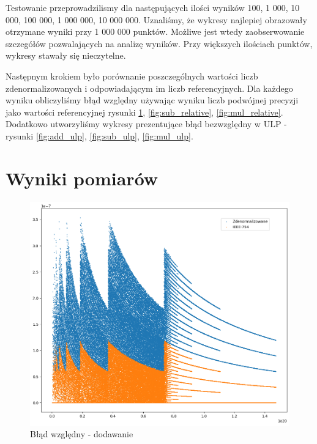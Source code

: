 \documentclass{article}
\begin{document}
Testowanie przeprowadzilismy dla następujących ilości wyników 100, 1 000, 10 000, 100 000, 1 000 000, 10 000 000.
Uznaliśmy, że wykresy najlepiej obrazowały otrzymane wyniki przy 1 000 000 punktów.
Możliwe jest wtedy zaobserwowanie szczegółów pozwalających na analizę wyników.
Przy większych ilościach punktów, wykresy stawały się nieczytelne.

Następnym krokiem było porównanie poszczególnych wartości liczb zdenormalizowanych i odpowiadającym im liczb referencyjnych.
Dla każdego wyniku obliczyliśmy błąd względny używając wyniku liczb podwójnej precyzji jako wartości referencyjnej rysunki \ref{fig:add_relative}, \ref{fig:sub_relative}, \ref{fig:mul_relative}.
Dodatkowo utworzyliśmy wykresy prezentujące błąd bezwzględny w ULP - rysunki \ref{fig:add_ulp}, \ref{fig:sub_ulp}, \ref{fig:mul_ulp}.


\section{Wyniki pomiarów}

\begin{figure}[H]
	\centering
	\includegraphics[height=0.4\textheight]{figures/add_relative.png}
	\caption{Błąd względny - dodawanie}
	\label{fig:add_relative}
\end{figure}
\end{document}
